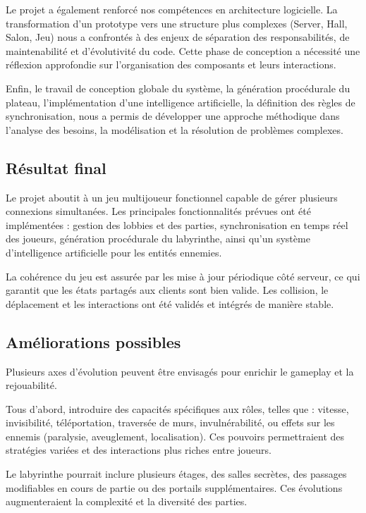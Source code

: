 \documentclass[a4paper, 11pt]{article}
\begin{document}
Le projet a également renforcé nos compétences en architecture logicielle. La transformation d’un prototype vers une structure plus complexes (Server, Hall, Salon, Jeu) nous a confrontés à des enjeux de séparation des responsabilités, de maintenabilité et d’évolutivité du code. Cette phase de conception a nécessité une réflexion approfondie sur l’organisation des composants et leurs interactions.

Enfin, le travail de conception globale du système, la génération procédurale du plateau, l'implémentation d’une intelligence artificielle, la définition des règles de synchronisation, nous a permis de développer une approche méthodique dans l’analyse des besoins, la modélisation et la résolution de problèmes complexes.

\subsection{Résultat final}

Le projet aboutit à un jeu multijoueur fonctionnel capable de gérer plusieurs connexions simultanées. Les principales fonctionnalités prévues ont été implémentées : gestion des lobbies et des parties, synchronisation en temps réel des joueurs, génération procédurale du labyrinthe, ainsi qu’un système d’intelligence artificielle pour les entités ennemies.

La cohérence du jeu est assurée par les mise à jour périodique côté serveur, ce qui garantit que les états partagés aux clients sont bien valide. Les collision, le déplacement et
les interactions ont été validés et intégrés de manière stable.

\subsection{Améliorations possibles}

Plusieurs axes d’évolution peuvent être envisagés pour enrichir le gameplay et la rejouabilité.

Tous d'abord, introduire des capacités spécifiques aux rôles, telles que : vitesse, invisibilité, téléportation, traversée de murs, invulnérabilité, ou effets sur les ennemis (paralysie, aveuglement, localisation). Ces pouvoirs permettraient des stratégies variées et des interactions plus riches entre joueurs.

Le labyrinthe pourrait inclure plusieurs étages, des salles secrètes, des passages modifiables en cours de partie ou des portails supplémentaires. Ces évolutions augmenteraient la complexité et la diversité des parties.
\end{document}

